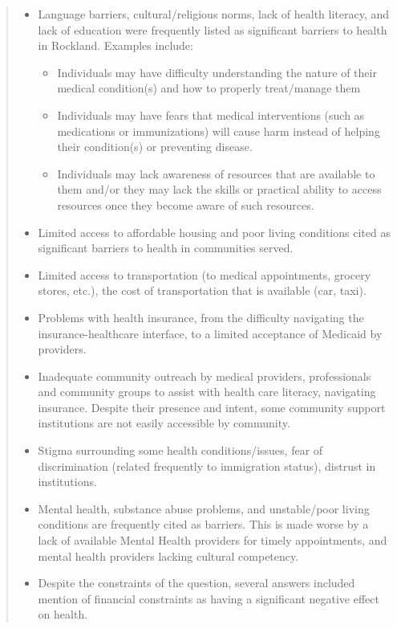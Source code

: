 \documentclass[
  english,
  letterpaper,
]{report}
\begin{document}
\begin{quote}
\begin{itemize}
\item
  Language barriers, cultural/religious norms, lack of health literacy,
  and lack of education were frequently listed as significant barriers
  to health in Rockland. Examples include:

  \begin{itemize}
  \item
    Individuals may have difficulty understanding the nature of their
    medical condition(s) and how to properly treat/manage them
  \item
    Individuals may have fears that medical interventions (such as
    medications or immunizations) will cause harm instead of helping
    their condition(s) or preventing disease.
  \item
    Individuals may lack awareness of resources that are available to
    them and/or they may lack the skills or practical ability to access
    resources once they become aware of such resources.
  \end{itemize}
\item
  Limited access to affordable housing and poor living conditions cited
  as significant barriers to health in communities served.
\item
  Limited access to transportation (to medical appointments, grocery
  stores, etc.), the cost of transportation that is available (car,
  taxi).
\item
  Problems with health insurance, from the difficulty navigating the
  insurance-healthcare interface, to a limited acceptance of Medicaid by
  providers.
\item
  Inadequate community outreach by medical providers, professionals and
  community groups to assist with health care literacy, navigating
  insurance. Despite their presence and intent, some community support
  institutions are not easily accessible by community.
\item
  Stigma surrounding some health conditions/issues, fear of
  discrimination (related frequently to immigration status), distrust in
  institutions.
\item
  Mental health, substance abuse problems, and unstable/poor living
  conditions are frequently cited as barriers. This is made worse by a
  lack of available Mental Health providers for timely appointments, and
  mental health providers lacking cultural competency.
\item
  Despite the constraints of the question, several answers included
  mention of financial constraints as having a significant negative
  effect on health.
\end{itemize}
\end{quote}
\end{document}
